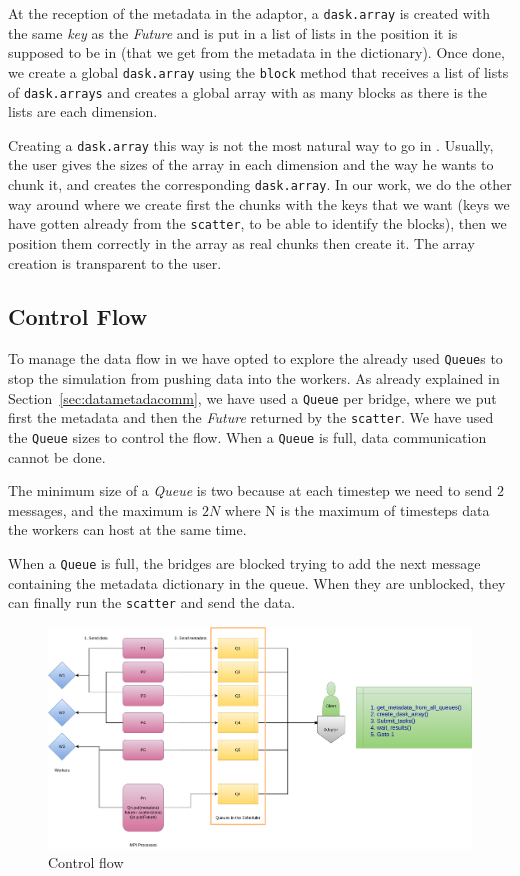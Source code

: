 At the reception of the metadata in the \deisa adaptor, a \texttt{dask.array} is created with the same \textit{key} as the \textit{Future} and is put in a list of lists in the position it is supposed to be in (that we get from the metadata in the dictionary). Once done, we create a global \texttt{dask.array} using the \texttt{block} method that receives a list of lists of \texttt{dask.arrays} and creates a global array with as many blocks as there is the lists are each dimension.  

Creating a \texttt{dask.array} this way is not the most natural way to go in \dask. Usually, the user gives \dask the sizes of the array in each dimension and the way he wants to chunk it, and \dask creates the corresponding \texttt{dask.array}. 
In our work, we do the other way around where we create first the chunks with the keys that we want (keys we have gotten already from the \texttt{scatter}, to be able to identify the blocks), then we position them correctly in the array as real chunks then create it.
The array creation is transparent to the user.  

\subsection{Control Flow}\label{sec:controlflow}

To manage the data flow in \deisa we have opted to explore the already used \texttt{Queue}s to stop the simulation from pushing data into the \dask workers. As already explained in Section~\ref{sec:datametadacomm}, we have used a \texttt{Queue} per bridge, where we put first the metadata and then the \textit{Future} returned by the \texttt{scatter}. We have used the \texttt{Queue} sizes to control the flow. When a \texttt{Queue} is full, data communication cannot be done.

The minimum size of a \textit{Queue} is two because at each timestep we need to send $2$ messages, and the maximum is $2N$ where N is the maximum of timesteps data the workers can host at the same time. 

When a \texttt{Queue} is full, the bridges are blocked trying to add the next message containing the metadata dictionary in the queue. When they are unblocked, they can finally run the \texttt{scatter} and send the data. 

\begin{figure}\centering
\includegraphics[width=\columnwidth]{figures/controlflow.pdf}
\caption{Control flow}
\label{figdataflow}
\end{figure}

